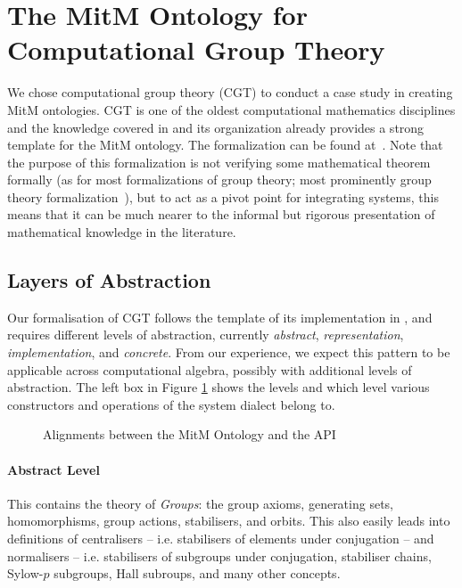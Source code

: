 \section{The MitM Ontology for Computational Group Theory}\label{sec:cgt}

We chose computational group theory (CGT) to conduct a case study in creating MitM ontologies. CGT is one of the oldest computational mathematics disciplines and the knowledge covered in \GAP and its organization already provides a strong template for the MitM ontology. The formalization can be found at~\cite{mitm:groups:on}. Note that the purpose of this formalization is not verifying some mathematical theorem formally (as for most formalizations of group theory; most prominently group theory formalization~\cite{Gonthier+:mcpoot13}), but to act as a pivot point for integrating systems, this means that it can be much nearer to the informal but rigorous presentation of mathematical knowledge in the literature.

\subsection{Layers of Abstraction}

Our formalisation of CGT follows the template of its implementation in \GAP, and requires
different levels of abstraction, currently \emph{abstract}, \emph{representation},
\emph{implementation}, and \emph{concrete}.  From our experience, we expect this pattern
to be applicable across computational algebra, possibly with additional levels of
abstraction. The left box in Figure \ref{fig:cgtontology} shows the levels and which level
various constructors and operations of the \GAP system dialect belong to.

\begin{figure}[ht]\centering
  \caption{Alignments between the MitM Ontology and the \GAP API}\label{fig:cgtontology}
\end{figure}
\paragraph{Abstract Level} This contains the theory of \emph{Groups}: the group axioms, generating sets, homomorphisms, group actions, stabilisers, and orbits.  
This also easily leads into definitions of centralisers -- i.e. stabilisers of elements under conjugation -- and normalisers -- i.e. stabilisers of subgroups under conjugation, stabiliser chains, Sylow-$p$ subgroups, Hall subroups, and many other concepts.

